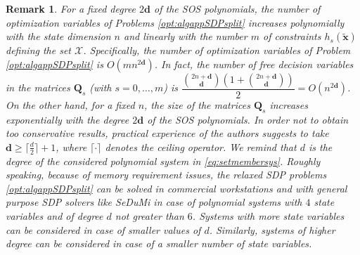 \documentclass[twocolumn]{autart}
\newtheorem{remark}{Remark}{\normalfont}{\normalfont}
\newcommand{\DP}[1]{{#1}}
\newcommand{\xaug}{\tilde{\mathbf{x}}}
\newcommand{\relorder}{\DP{\mathbf{d}}}
\begin{document}
\begin{remark}
 \DP{For a fixed degree $2\relorder$ of the SOS polynomials, the number of optimization variables of Problems \eqref{opt:algappSDPsplit} increases  polynomially with the state dimension $n$ and linearly with the number $m$ of constraints $h_s(\xaug)$ defining the set $\mathcal{X}$. Specifically, the number of optimization variables of Problem \eqref{opt:algappSDPsplit} is $O(mn^{2\relorder})$. In fact, the number of free decision variables in the matrices $\mathbf{Q}_s$ (with $s=0,\ldots,m$) is $\dfrac{{2n+\relorder \choose \relorder}\left(1+{2n+\relorder \choose \relorder}\right)}{2}=O(n^{2\relorder})$. On the other hand, for a fixed $n$, the size of the matrices $\mathbf{Q}_s$ increases exponentially with the degree $2\relorder$ of the SOS polynomials. In order not to obtain too conservative results, practical experience of the authors  suggests to take   $\relorder\geq \lceil \frac{d}{2} \rceil+1$, where $\lceil \cdot \rceil$ denotes the ceiling operator. We  remind that $d$ is the degree of the considered polynomial system in \eqref{eq:setmembersys}. Roughly speaking, because of memory requirement issues, the relaxed SDP problems \eqref{opt:algappSDPsplit} can be solved in commercial workstations and with general purpose SDP solvers like \emph{SeDuMi} in case of polynomial systems with $4$ state variables and of degree   $d$  not greater than $6$. Systems with more state variables can be considered in case of smaller values of $d$. Similarly, systems of higher degree can be considered  in case of a smaller number of state variables.}
 \end{remark}
\end{document}
